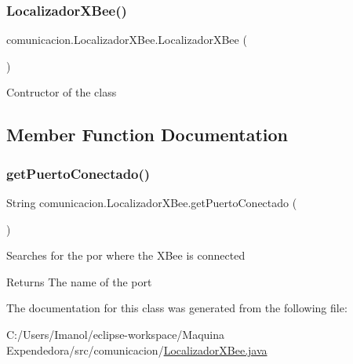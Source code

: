 \subsubsection{\texorpdfstring{Localizador\+X\+Bee()}{LocalizadorXBee()}}
{\footnotesize\ttfamily comunicacion.\+Localizador\+X\+Bee.\+Localizador\+X\+Bee (\begin{DoxyParamCaption}{ }\end{DoxyParamCaption})}

Contructor of the class 

\subsection{Member Function Documentation}
\mbox{\label{classcomunicacion_1_1_localizador_x_bee_a1c4e579949b66e7b134f31779b326ff3}} 
\subsubsection{\texorpdfstring{get\+Puerto\+Conectado()}{getPuertoConectado()}}
{\footnotesize\ttfamily String comunicacion.\+Localizador\+X\+Bee.\+get\+Puerto\+Conectado (\begin{DoxyParamCaption}{ }\end{DoxyParamCaption})}

Searches for the por where the X\+Bee is connected \begin{DoxyReturn}{Returns}
The name of the port 
\end{DoxyReturn}


The documentation for this class was generated from the following file\+:\begin{DoxyCompactItemize}
\item 
C\+:/\+Users/\+Imanol/eclipse-\/workspace/\+Maquina Expendedora/src/comunicacion/\mbox{\hyperlink{_localizador_x_bee_8java}{Localizador\+X\+Bee.\+java}}\end{DoxyCompactItemize}
